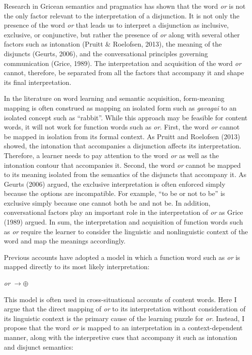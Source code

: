 \documentclass[floatsintext,man]{apa6}
\theoremstyle{definition}
\theoremstyle{definition}
\theoremstyle{definition}
\theoremstyle{remark}
\begin{document}
Research in Gricean semantics and pragmatics has shown that the word
\emph{or} is not the only factor relevant to the interpretation of a
disjunction. It is not only the presence of the word \emph{or} that
leads us to interpret a disjunction as inclusive, exclusive, or
conjunctive, but rather the presence of \emph{or} along with several
other factors such as intonation (Pruitt \& Roelofsen, 2013), the
meaning of the disjuncts (Geurts, 2006), and the conversational
principles governing communication (Grice, 1989). The interpretation and
acquisition of the word \emph{or} cannot, therefore, be separated from
all the factors that accompany it and shape its final interpretation.

In the literature on word learning and semantic acquisition,
form-meaning mapping is often construed as mapping an isolated form such
as \emph{gavagai} to an isolated concept such as \enquote{rabbit}. While
this approach may be feasible for content words, it will not work for
function words such as \emph{or}. First, the word \emph{or} cannot be
mapped in isolation from its formal context. As Pruitt and Roelofsen
(2013) showed, the intonation that accompanies a disjunction affects its
interpretation. Therefore, a learner needs to pay attention to the word
\emph{or} as well as the intonation contour that accompanies it. Second,
the word \emph{or} cannot be mapped to its meaning isolated from the
semantics of the disjuncts that accompany it. As Geurts (2006) argued,
the exclusive interpretation is often enforced simply because the
options are incompatible. For example, \enquote{to be or not to be} is
exclusive simply because one cannot both be and not be. In addition,
conversational factors play an important role in the interpretation of
\emph{or} as Grice (1989) argued. In sum, the interpretation and
acquisition of function words such as \emph{or} require the learner to
consider the linguistic and nonlinguistic context of the word and map
the meanings accordingly.

Previous accounts have adopted a model in which a function word such as
\emph{or} is mapped directly to its most likely interpretation:

\emph{or} \(\rightarrow \oplus\)

This model is often used in cross-situational accounts of content words.
Here I argue that the direct mapping of \emph{or} to its interpretation
without consideration of its linguistic context is the primary cause of
the learning puzzle for \emph{or}. Instead, I propose that the word
\emph{or} is mapped to an interpretation in a context-dependent manner,
along with the interpretive cues that accompany it such as intonation
and disjunct semantics:
\end{document}
